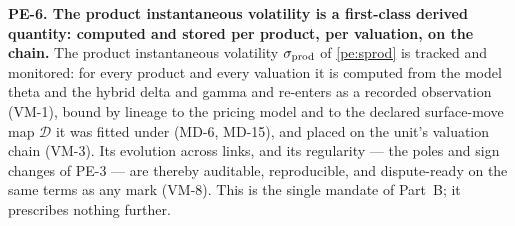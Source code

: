 \textbf{PE-6. The product instantaneous volatility is a
first-class derived quantity: computed and stored per product, per valuation, on
the chain.} The product instantaneous volatility $\sigma_{\mathrm{prod}}$ of \eqref{pe:sprod} is
tracked and monitored: for every product and every valuation it is computed from
the model theta and the hybrid delta and gamma and re-enters as a recorded
observation (VM-1), bound by lineage to the pricing model and to the declared
surface-move map $\mathcal{D}$ it was fitted under (MD-6, MD-15), and placed on
the unit's valuation chain (VM-3). Its evolution across links, and its
regularity --- the poles and sign changes of PE-3 --- are thereby auditable,
reproducible, and dispute-ready on the same terms as any mark (VM-8). This is
the single mandate of Part~B; it prescribes nothing further.
